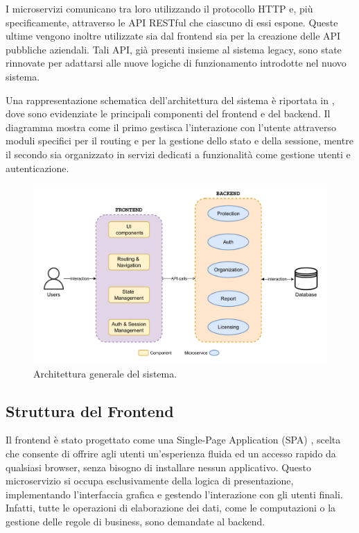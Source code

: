 I microservizi comunicano tra loro utilizzando il protocollo HTTP e, più specificamente, attraverso le API RESTful che ciascuno di essi espone. Queste ultime vengono inoltre utilizzate sia dal frontend sia per la creazione delle API pubbliche aziendali. Tali API, già presenti insieme al sistema legacy, sono state rinnovate per adattarsi alle nuove logiche di funzionamento introdotte nel nuovo sistema.

Una rappresentazione schematica dell'architettura del sistema è riportata in , dove sono evidenziate le principali componenti del frontend e del backend. Il diagramma mostra come il primo gestisca l'interazione con l'utente attraverso moduli specifici per il routing e per la gestione dello stato e della sessione, mentre il secondo sia organizzato in servizi dedicati a funzionalità come gestione utenti e autenticazione.

\begin{figure}
  \centering
  \includegraphics[width=1\textwidth]{figures/system-architecture.pdf}
  \caption{Architettura generale del sistema.}
  \label{fig:system-architecture}
\end{figure}

\subsection{Struttura del Frontend}
Il frontend è stato progettato come una Single-Page Application (SPA) \cite{Fink2014}, scelta che consente di offrire agli utenti un'esperienza fluida ed un accesso rapido da qualsiasi browser, senza bisogno di installare nessun applicativo. Questo microservizio si occupa esclusivamente della logica di presentazione, implementando l'interfaccia grafica e gestendo l'interazione con gli utenti finali. Infatti, tutte le operazioni di elaborazione dei dati, come le computazioni o la gestione delle regole di business, sono demandate al backend.

